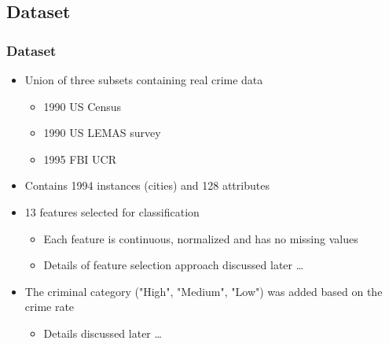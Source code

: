 \mode*

\begin{frame}
	\section{Dataset}
	\frametitle{Dataset}
        \begin{itemize}
          \item Union of three subsets containing real crime data
            \begin{itemize}
              \item 1990 US Census
              \item 1990 US LEMAS survey
              \item 1995 FBI UCR
              \end{itemize}
          \item Contains 1994 instances (cities) and 128 attributes
          \item 13 features selected for classification
            \begin{itemize}
              \item Each feature is continuous, normalized and has no missing values
              \item Details of feature selection approach discussed later \ldots
            \end{itemize}
          \item The criminal category ("High", "Medium", "Low") was added based on the crime rate
            \begin{itemize}
              \item Details discussed later \ldots
            \end{itemize}
        \end{itemize}
\end{frame}

